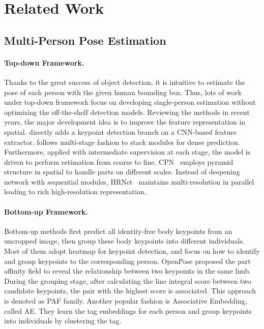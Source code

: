 \documentclass{article}
\begin{document}
\section{Related Work}
\subsection{Multi-Person Pose Estimation}


\paragraph{Top-down Framework.}
Thanks to the great success of object detection,
it is intuitive to estimate the pose of each person with the given human bounding box. Thus, lots of work under top-down framework focus on developing single-person estimation without optimizing the off-the-shelf detection models.
Reviewing the methods in recent years, the major development idea is to improve the feature representation in spatial. \cite{he2017mask} directly adds a keypoint detection branch on a CNN-based feature extractor. \cite{newell2016stacked} follows multi-stage fashion to stack modules for dense prediction. Furthermore, applied with intermediate supervision at each stage, the model is driven to perform estimation from coarse to fine. CPN~\cite{chen2018cascaded} employs pyramid structure in spatial to handle parts on different scales. Instead of deepening network with sequential modules, HRNet~\cite{sun2019deep} maintains multi-resolution in parallel leading to rich high-resolution representation.\\

\noindent\paragraph{Bottom-up Framework.}
Bottom-up methods first predict all identity-free body keypoints from an uncropped image, then group these body keypoints into different individuals. Most of them adopt heatmap for keypoint detection, and focus on how to identify and group keypoints to the corresponding person. OpenPose \cite{cao2019openpose} proposed the part affinity field to reveal the relationship between two keypoints in the same limb. During the grouping stage, after calculating the line integral score between two candidate keypoints, the pair with the highest score is associated. This approach is denoted as PAF family. Another popular fashion is Associative Embedding, called AE\cite{newell2016associative,cheng2020higherhrnet}. They learn the tag embeddings for each person and group keypoints into individuals by clustering the tag. 
\end{document}
